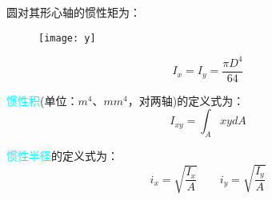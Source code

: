 \documentclass[10pt,a4paper]{ctexart}
\begin{document}
圆对其形心轴的惯性矩为：
\begin{figure}[htp]%
	\centering
	\texttt{[image: y]}
\end{figure}
\begin{equation}
	I_x=I_y=\frac{\pi D^4}{64}
\end{equation}

\textcolor{cyan}{惯性积}(单位：$m^4$、$mm^4$，对两轴)的定义式为：
\begin{equation}
I_{xy}=\int_A xydA
\end{equation}

\textcolor{cyan}{惯性半径}的定义式为：
\begin{equation}
i_x=\sqrt{\frac{I_x}{A}} \qquad i_y=\sqrt{\frac{I_y}{A}}
\end{equation}





























\newpage


\end{document}
